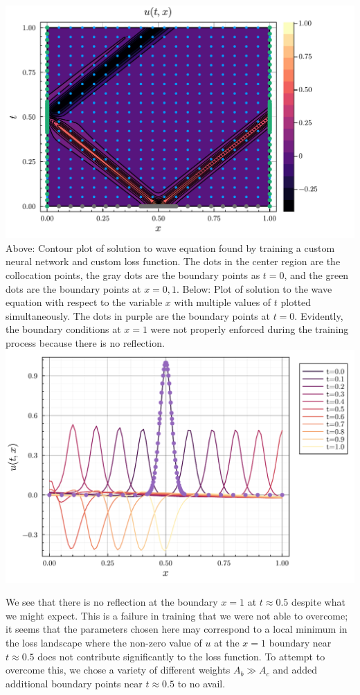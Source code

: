 \documentclass[11pt]{article}
\newcommand{\1}{\mathbf 1}
\begin{document}
\begin{singlespace}
\begin{center}
	\includegraphics[width=0.9\linewidth]{fig/custom_wave_eq_contour.pdf}
	\\
	Above: Contour plot of solution to wave equation found by training a custom neural network and custom loss function.
	The dots in the center region are the collocation points, the gray dots are the boundary points as $t = 0$, and the green dots are the boundary points at $x = 0,1$.
	Below:
	Plot of solution to the wave equation with respect to the variable $x$ with multiple values of $t$ plotted simultaneously.
	The dots in purple are the boundary points at $t = 0$.
	Evidently, the boundary conditions at $x = 1$ were not properly enforced during the training process because there is no reflection.
	\\
	\includegraphics[width=0.9\linewidth]{fig/custom_wave_eq_x.pdf}
\end{center}
\end{singlespace}
We see that there is no reflection at the boundary $x = 1$ at $t \approx 0.5$ despite what we might expect.
This is a failure in training that we were not able to overcome; it seems that the parameters chosen here may correspond to a local minimum in the loss landscape where the non-zero value of $u$ at the $x = 1$ boundary near $t \approx 0.5$ does not contribute significantly to the loss function.
To attempt to overcome this, we chose a variety of different weights $A_b \gg A_c$ and added additional boundary points near $t \approx 0.5$ to no avail.
\end{document}
